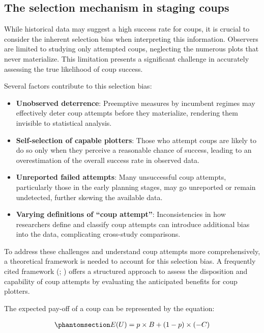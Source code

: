 \documentclass[
  12pt,
]{report}
\begin{document}
\subsection{The selection mechanism in staging
coups}\label{the-selection-mechanism-in-staging-coups}

While historical data may suggest a high success rate for coups, it is
crucial to consider the inherent selection bias when interpreting this
information. Observers are limited to studying only attempted coups,
neglecting the numerous plots that never materialize. This limitation
presents a significant challenge in accurately assessing the true
likelihood of coup success.

Several factors contribute to this selection bias:

\begin{itemize}
\item
  \textbf{Unobserved deterrence}: Preemptive measures by incumbent
  regimes may effectively deter coup attempts before they materialize,
  rendering them invisible to statistical analysis.
\item
  \textbf{Self-selection of capable plotters}: Those who attempt coups
  are likely to do so only when they perceive a reasonable chance of
  success, leading to an overestimation of the overall success rate in
  observed data.
\item
  \textbf{Unreported failed attempts}: Many unsuccessful coup attempts,
  particularly those in the early planning stages, may go unreported or
  remain undetected, further skewing the available data.
\item
  \textbf{Varying definitions of ``coup attempt''}: Inconsistencies in
  how researchers define and classify coup attempts can introduce
  additional bias into the data, complicating cross-study comparisons.
\end{itemize}

To address these challenges and understand coup attempts more
comprehensively, a theoretical framework is needed to account for this
selection bias. A frequently cited framework
(;
) offers a structured
approach to assess the disposition and capability of coup attempts by
evaluating the anticipated benefits for coup plotters.

The expected pay-off of a coup can be represented by the equation:

\begin{equation}\phantomsection\label{eq-eq1}{
\begin{aligned}
E(U) = p \times B + (1 - p) \times (-C)
\end{aligned}
}\end{equation}
\end{document}
